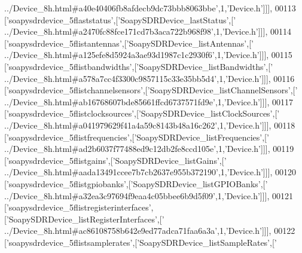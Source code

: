 \begin{DoxyCode}
{      ../Device\_8h.html#a40e40406fb8afdecb9dc73bbb8063bbe'},1,\textcolor{stringliteral}{'Device.h'}]]],
00113   [\textcolor{stringliteral}{'soapysdrdevice\_5flaststatus'},[\textcolor{stringliteral}{'SoapySDRDevice\_lastStatus'},[\textcolor{stringliteral}{'
      ../Device\_8h.html#a2470fc88fce171cd7b3aca722b968f98'},1,\textcolor{stringliteral}{'Device.h'}]]],
00114   [\textcolor{stringliteral}{'soapysdrdevice\_5flistantennas'},[\textcolor{stringliteral}{'SoapySDRDevice\_listAntennas'},[\textcolor{stringliteral}{'
      ../Device\_8h.html#a125efe8d5924a3ae93d1987c1c2930f6'},1,\textcolor{stringliteral}{'Device.h'}]]],
00115   [\textcolor{stringliteral}{'soapysdrdevice\_5flistbandwidths'},[\textcolor{stringliteral}{'SoapySDRDevice\_listBandwidths'},[\textcolor{stringliteral}{'
      ../Device\_8h.html#a578a7cc4f3300c9857115c33e35bb5d4'},1,\textcolor{stringliteral}{'Device.h'}]]],
00116   [\textcolor{stringliteral}{'soapysdrdevice\_5flistchannelsensors'},[\textcolor{stringliteral}{'SoapySDRDevice\_listChannelSensors'},[\textcolor{stringliteral}{'
      ../Device\_8h.html#ab16768607bde85661ffcd6737571fd9e'},1,\textcolor{stringliteral}{'Device.h'}]]],
00117   [\textcolor{stringliteral}{'soapysdrdevice\_5flistclocksources'},[\textcolor{stringliteral}{'SoapySDRDevice\_listClockSources'},[\textcolor{stringliteral}{'
      ../Device\_8h.html#a041979629f41a4a59c8143b48a16c262'},1,\textcolor{stringliteral}{'Device.h'}]]],
00118   [\textcolor{stringliteral}{'soapysdrdevice\_5flistfrequencies'},[\textcolor{stringliteral}{'SoapySDRDevice\_listFrequencies'},[\textcolor{stringliteral}{'
      ../Device\_8h.html#ad2b6037f77488ed9c12db2fe8ccd105e'},1,\textcolor{stringliteral}{'Device.h'}]]],
00119   [\textcolor{stringliteral}{'soapysdrdevice\_5flistgains'},[\textcolor{stringliteral}{'SoapySDRDevice\_listGains'},[\textcolor{stringliteral}{'
      ../Device\_8h.html#aada13491ccee7b7cb2637e955b372190'},1,\textcolor{stringliteral}{'Device.h'}]]],
00120   [\textcolor{stringliteral}{'soapysdrdevice\_5flistgpiobanks'},[\textcolor{stringliteral}{'SoapySDRDevice\_listGPIOBanks'},[\textcolor{stringliteral}{'
      ../Device\_8h.html#a32ea3c97694f9eaa4c05bbee6b9d5f09'},1,\textcolor{stringliteral}{'Device.h'}]]],
00121   [\textcolor{stringliteral}{'soapysdrdevice\_5flistregisterinterfaces'},[\textcolor{stringliteral}{'SoapySDRDevice\_listRegisterInterfaces'},[\textcolor{stringliteral}{'
      ../Device\_8h.html#ac86108758b642e9ed77adca71faa6a3a'},1,\textcolor{stringliteral}{'Device.h'}]]],
00122   [\textcolor{stringliteral}{'soapysdrdevice\_5flistsamplerates'},[\textcolor{stringliteral}{'SoapySDRDevice\_listSampleRates'},[\textcolor{stringliteral}{'
}
\end{DoxyCode}
